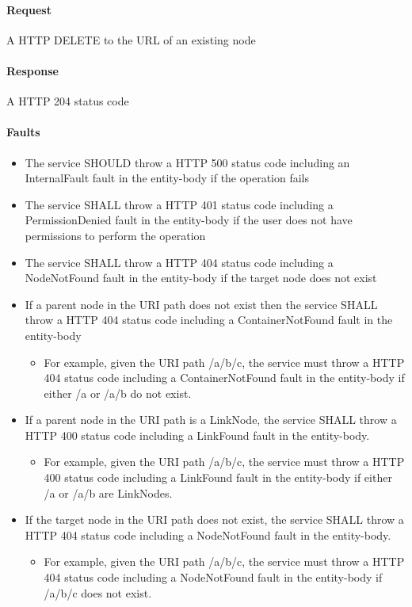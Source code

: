 \documentclass[11pt,a4paper]{ivoa}
\begin{document}
\paragraph{Request}
A HTTP DELETE to the URL of an existing node

\paragraph{Response}
A HTTP 204 status code

\paragraph{Faults}
\begin{itemize}
    \item The service SHOULD throw a HTTP 500 status code including an InternalFault fault in the entity-body if the operation fails
    \item The service SHALL throw a HTTP 401 status code including a PermissionDenied fault in the entity-body if the user does not have permissions to perform the operation
    \item The service SHALL throw a HTTP 404 status code including a NodeNotFound fault in the entity-body if the target node does not exist
    \item If a parent node in the URI path does not exist then the service SHALL throw a HTTP 404 status code including a ContainerNotFound fault in the entity-body
    \begin{itemize}
        \item For example, given the URI path /a/b/c, the service must throw a HTTP 404 status code including a ContainerNotFound fault in the entity-body if either /a or /a/b do not exist.
    \end{itemize}
    \item If a parent node in the URI path is a LinkNode, the service SHALL throw a HTTP 400 status code including a LinkFound fault in the entity-body.
    \begin{itemize}
        \item For example, given the URI path /a/b/c, the service must throw a HTTP 400 status code including a LinkFound fault in the entity-body if either /a or /a/b are LinkNodes.
    \end{itemize}
    \item If the target node in the URI path does not exist, the service SHALL throw a HTTP 404 status code including a NodeNotFound fault in the entity-body.
    \begin{itemize}
        \item For example, given the URI path /a/b/c, the service must throw a HTTP 404 status code including a NodeNotFound fault in the entity-body if /a/b/c does not exist.
    \end{itemize}
\end{itemize}
\end{document}
